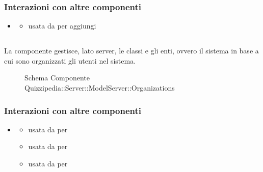 \subsubsection{Interazioni con altre componenti}
\begin{itemize}
\item {}
\begin{itemize}
\item usata da  per aggiungi
\end{itemize}
\end{itemize}
\subsection{}
La componente gestisce, lato server, le classi e gli enti, ovvero il sistema in base a cui sono organizzati gli utenti nel sistema.
\begin{figure}[H]
\centering
\noindent{}
\caption[Schema Componente Quizzipedia::Server::ModelServer::Organizations]{Schema Componente Quizzipedia::Server::ModelServer::Organizations}
\end{figure}
\subsubsection{Interazioni con altre componenti}
\begin{itemize}
\item {}
\begin{itemize}
\item usata da  per 
\item usata da  per 
\item usata da  per 
\end{itemize}
\end{itemize}
